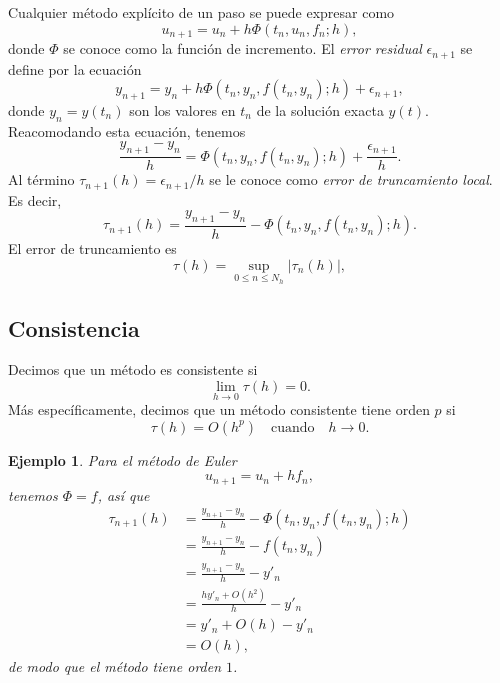 \documentclass[11pt,letterpaper]{report}
\newtheorem{example}{Ejemplo}
\begin{document}
Cualquier método explícito de un paso se puede expresar como
\begin{equation}
  u_{n+1} = u_n + h \Phi(t_n,u_n,f_n;h)
,\end{equation}
donde $\Phi$ se conoce como la función de incremento.
El \emph{error residual} $\epsilon_{n+1}$ se define por la ecuación
\begin{equation}
  y_{n+1}
  =
  y_n + h\Phi(t_n,y_n,f(t_n,y_n);h) + \epsilon_{n+1}
,\end{equation}
donde $y_n = y(t_n)$ son los valores en $t_n$ de la solución exacta
$y(t)$.
Reacomodando esta ecuación, tenemos
\begin{equation}
  \frac{y_{n+1} - y_n}{h}
  =
  \Phi(t_n,y_n,f(t_n,y_n);h) + \frac{\epsilon_{n+1}}{h}
.\end{equation}
Al término $\tau_{n+1}(h)=\epsilon_{n+1}/h$ se le conoce como
\emph{error de truncamiento local}. Es decir,
\begin{equation}
  \tau_{n+1}(h)
  =
  \frac{y_{n+1} - y_n}{h} -\Phi(t_n,y_n,f(t_n,y_n);h)
.\end{equation}
El error de truncamiento es
\begin{equation}
  \tau(h) = \sup_{0\leq n\leq N_h} |\tau_{n}(h)|
,\end{equation}

\subsection{Consistencia}

Decimos que un método es consistente si
\begin{equation}
  \lim_{h\to 0}\tau(h) = 0
.\end{equation}
Más específicamente, decimos que un método consistente tiene orden
$p$ si
\begin{equation}
  \tau(h) = O(h^p) \quad \text{cuando} \quad h\to 0
.\end{equation}

\begin{example}
  Para el método de Euler
  \begin{equation}
    u_{n+1} = u_n + hf_n
  ,\end{equation}
  tenemos $\Phi = f$, así que
  \begin{align}
    \tau_{n+1}(h)
    &= \frac{y_{n+1}-y_n}{h}-\Phi(t_n,y_n,f(t_n,y_n);h) \\
    &= \frac{y_{n+1}-y_n}{h}-f(t_n,y_n) \\
    &= \frac{y_{n+1}-y_n}{h}-y'_n \\
    &= \frac{hy'_n + O(h^2)}{h}-y'_n \\
    &= y'_n + O(h)-y'_n \\
    &= O(h)
  ,\end{align}
  de modo que el método tiene orden $1$.
\end{example}
\end{document}
